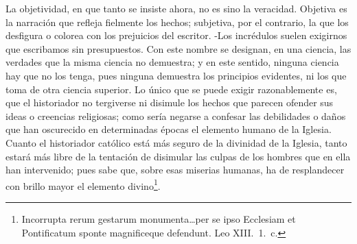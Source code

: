 \raggedbottom{} \documentclass[12pt, a4paper]{book}
\begin{document}
La objetividad, en que tanto se insiste ahora, no es sino la veracidad. Objetiva es la narración que refleja fielmente los hechos; subjetiva, por el contrario, la que los desfigura o colorea con los prejuicios del escritor. -Los incrédulos suelen exigirnos que escribamos sin presupuestos. Con este nombre se designan, en una ciencia, las verdades que la misma ciencia no demuestra; y en este sentido, ninguna ciencia hay que no los tenga, pues ninguna demuestra los principios evidentes, ni los que toma de otra ciencia superior. Lo único que se puede exigir razonablemente es, que el historiador no tergiverse ni disimule los hechos que parecen ofender sus ideas o creencias religiosas; como sería negarse a confesar las debilidades o daños que han oscurecido en determinadas épocas el elemento humano de la Iglesia. Cuanto el historiador católico está más seguro de la divinidad de la Iglesia, tanto estará más libre de la tentación de disimular las culpas de los hombres que en ella han intervenido; pues sabe que, sobre esas miserias humanas, ha de resplandecer con brillo mayor el elemento divino\footnote{Incorrupta rerum gestarum monumenta\ldots per se ipso Ecclesiam et Pontificatum sponte magnificeque defendunt. Leo XIII.\ 1.\ c.}.
\end{document}
